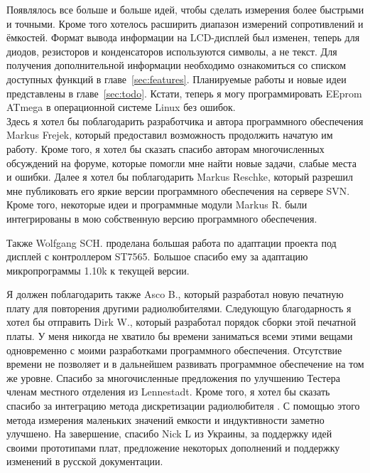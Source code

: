 Появлялось все больше и больше идей, чтобы сделать измерения более быстрыми и точными. Кроме того хотелось расширить 
диапазон измерений сопротивлений и ёмкостей. Формат вывода информации на LCD-дисплей был изменен, теперь для диодов, 
резисторов и конденсаторов используются символы, а не текст. Для получения дополнительной информации необходимо 
ознакомиться со списком доступных функций в главе~\ref{sec:features}. Планируемые работы и новые идеи представлены 
в главе~\ref{sec:todo}. Кстати, теперь я могу программировать EEprom ATmega в операционной системе Linux без ошибок.\\

Здесь я хотел бы поблагодарить разработчика и автора программного обеспечения Markus Frejek, который предоставил 
возможность продолжить начатую им работу. Кроме того, я хотел бы сказать спасибо авторам многочисленных обсуждений 
на форуме, которые помогли мне найти новые задачи, слабые места и ошибки. Далее я хотел бы поблагодарить Markus 
Reschke, который разрешил мне публиковать его яркие версии программного обеспечения на сервере SVN. 
Кроме того, некоторые идеи и программные модули Markus R. были интегрированы в мою собственную версию программного 
обеспечения.

Также Wolfgang SCH. проделана большая работа по адаптации проекта под дисплей с контроллером ST7565. Большое спасибо ему
за адаптацию микропрограммы 1.10k к текущей версии.

Я должен поблагодарить также Asco B., который разработал новую печатную плату для повторения другими 
радиолюбителями. Следующую благодарность я хотел бы отправить Dirk W., который разработал порядок сборки этой печатной 
платы. У меня никогда не хватило бы времени заниматься всеми этими вещами одновременно с моими разработками 
программного обеспечения. Отсутствие времени не позволяет и в дальнейшем развивать программное обеспечение на том же 
уровне. Спасибо за многочисленные предложения по улучшению Тестера членам местного отделения 
 из Lennestadt.
Кроме того, я хотел бы сказать спасибо за интеграцию метода дискретизации радиолюбителя .
С помощью этого метода измерения маленьких значений емкости и индуктивности заметно улучшено.
На завершение, спасибо Nick L из Украины, за поддержку идей своими прототипами плат, предложение некоторых дополнений и
поддержку изменений в русской документации. 
